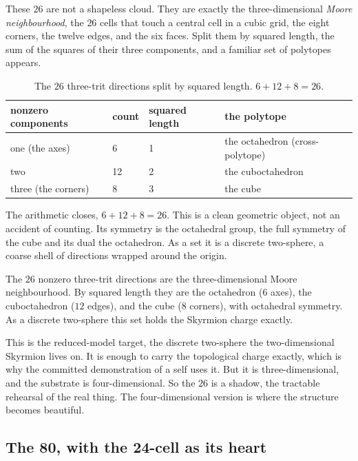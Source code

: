 These $26$ are not a shapeless cloud. They are exactly the three-dimensional \emph{Moore neighbourhood}, the $26$ cells that touch a central cell in a cubic grid, the eight corners, the twelve edges, and the six faces. Split them by squared length, the sum of the squares of their three components, and a familiar set of polytopes appears.

\begin{table}[ht]
\centering
\begin{tabular}{@{}llll@{}}
\toprule
nonzero components & count & squared length & the polytope \\
\midrule
one (the axes) & 6 & 1 & the octahedron (cross-polytope) \\
two & 12 & 2 & the cuboctahedron \\
three (the corners) & 8 & 3 & the cube \\
\bottomrule
\end{tabular}
\caption{The $26$ three-trit directions split by squared length. $6 + 12 + 8 = 26$.}
\label{tab:the-26}
\end{table}

The arithmetic closes, $6 + 12 + 8 = 26$. This is a clean geometric object, not an accident of counting. Its symmetry is the octahedral group, the full symmetry of the cube and its dual the octahedron. As a set it is a discrete two-sphere, a coarse shell of directions wrapped around the origin.

\begin{proposition}
The $26$ nonzero three-trit directions are the three-dimensional Moore neighbourhood. By squared length they are the octahedron ($6$ axes), the cuboctahedron ($12$ edges), and the cube ($8$ corners), with octahedral symmetry. As a discrete two-sphere this set holds the Skyrmion charge exactly.
\end{proposition}

This is the reduced-model target, the discrete two-sphere the two-dimensional Skyrmion lives on. It is enough to carry the topological charge exactly, which is why the committed demonstration of a self uses it. But it is three-dimensional, and the substrate is four-dimensional. So the $26$ is a shadow, the tractable rehearsal of the real thing. The four-dimensional version is where the structure becomes beautiful.

\subsection{The 80, with the 24-cell as its heart}


